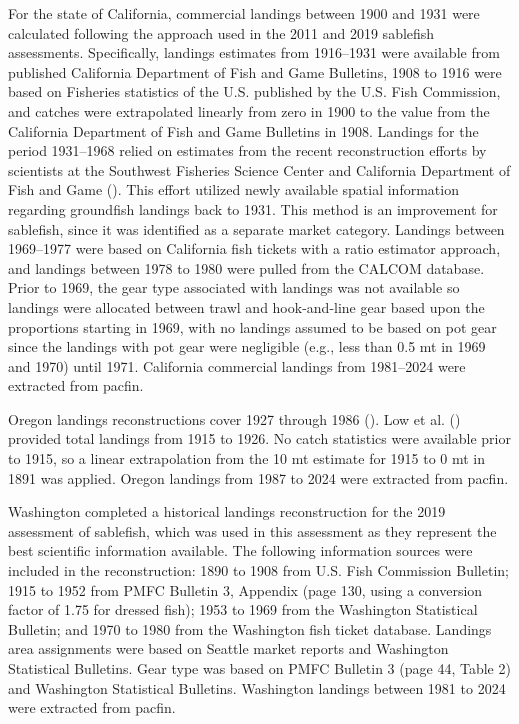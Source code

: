 \documentclass[
  english,
]{article}
\begin{document}
For the state of California, commercial landings between 1900 and 1931
were calculated following the approach used in the 2011 and 2019
sablefish assessments. Specifically, landings estimates from 1916--1931
were available from published California Department of Fish and Game
Bulletins, 1908 to 1916 were based on Fisheries statistics of the U.S.
published by the U.S. Fish Commission, and catches were extrapolated
linearly from zero in 1900 to the value from the California Department
of Fish and Game Bulletins in 1908. Landings for the period 1931--1968
relied on estimates from the recent reconstruction efforts by scientists
at the Southwest Fisheries Science Center and California Department of
Fish and Game (). This effort utilized newly available spatial information
regarding groundfish landings back to 1931. This method is an
improvement for sablefish, since it was identified as a separate market
category. Landings between 1969--1977 were based on California fish
tickets with a ratio estimator approach, and landings between 1978 to
1980 were pulled from the CALCOM database. Prior to 1969, the gear type
associated with landings was not available so landings were allocated
between trawl and hook-and-line gear based upon the proportions starting
in 1969, with no landings assumed to be based on pot gear since the
landings with pot gear were negligible (e.g., less than 0.5 mt in 1969
and 1970) until 1971. California commercial landings from 1981--2024
were extracted from \gls{pacfin}.

Oregon landings reconstructions cover 1927 through 1986
(). Low
et al. () provided total landings
from 1915 to 1926. No catch statistics were available prior to 1915, so
a linear extrapolation from the 10 mt estimate for 1915 to 0 mt in 1891
was applied. Oregon landings from 1987 to 2024 were extracted from
\gls{pacfin}.

Washington completed a historical landings reconstruction for the 2019
assessment of sablefish, which was used in this assessment as they
represent the best scientific information available. The following
information sources were included in the reconstruction: 1890 to 1908
from U.S. Fish Commission Bulletin; 1915 to 1952 from PMFC Bulletin 3,
Appendix (page 130, using a conversion factor of 1.75 for dressed fish);
1953 to 1969 from the Washington Statistical Bulletin; and 1970 to 1980
from the Washington fish ticket database. Landings area assignments were
based on Seattle market reports and Washington Statistical Bulletins.
Gear type was based on PMFC Bulletin 3 (page 44, Table 2) and Washington
Statistical Bulletins. Washington landings between 1981 to 2024 were
extracted from \gls{pacfin}.
\end{document}
